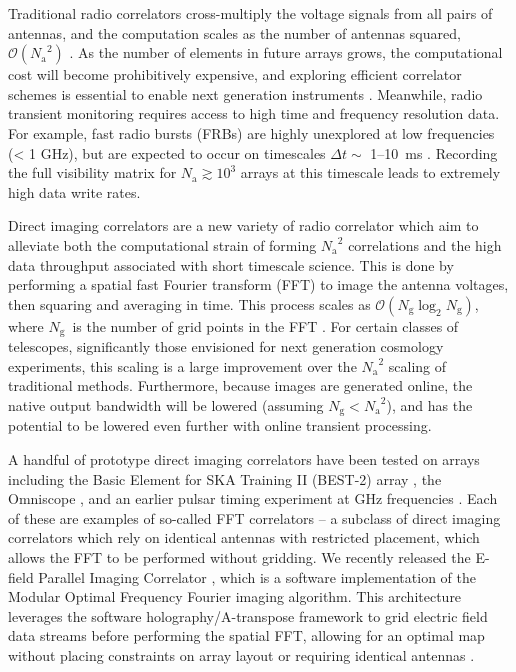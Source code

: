 \documentclass[a4paper,fleqn,usenatbib]{../mnras}
\newcommand{\Nant}{\ensuremath{N_{\mathrm{a}}}}
\newcommand{\Ng}{\ensuremath{N_{\mathrm{g}}}}
\begin{document}
Traditional radio correlators cross-multiply the voltage signals from all pairs of antennas, and the computation scales as the number of antennas squared, $\mathcal{O}(\Nant^2)$ \citep{bun04}. As the number of elements in future arrays grows, the computational cost will become prohibitively expensive, and exploring efficient correlator schemes is essential to enable next generation instruments \citep{lon00}. Meanwhile, radio transient monitoring requires access to high time and frequency resolution data. For example, fast radio bursts (FRBs) are highly unexplored at low frequencies (< 1 GHz), but are expected to occur on timescales $\Delta t \sim$ 1--10~ms \citep{tho13}. Recording the full visibility matrix for $\Nant \gtrsim 10^3$ arrays at this timescale leads to extremely high data write rates. 

Direct imaging correlators are a new variety of radio correlator which aim to alleviate both the computational strain of forming $\Nant^2$ correlations and the high data throughput associated with short timescale science. This is done by performing a spatial fast Fourier transform (FFT) to image the antenna voltages, then squaring and averaging in time. This process scales as $\mathcal{O}(\Ng \log_2 \Ng)$, where \Ng~is the number of grid points in the FFT \citep{mor11, teg09, teg10}. For certain classes of telescopes, significantly those envisioned for next generation cosmology experiments, this scaling is a large improvement over the $\Nant^2$ scaling of traditional methods. Furthermore, because images are generated online, the native output bandwidth will be lowered (assuming $\Ng < \Nant^2$), and has the potential to be lowered even further with online transient processing.

A handful of prototype direct imaging correlators have been tested on arrays including the Basic Element for SKA Training II (BEST-2) array \citep{fos14}, the Omniscope \citep{zhe14}, and an earlier pulsar timing experiment at GHz frequencies \citep{oto94, dai00}. Each of these are examples of so-called FFT correlators -- a subclass of direct imaging correlators which rely on identical antennas with restricted placement, which allows the FFT to be performed without gridding. We recently released the E-field Parallel Imaging Correlator \citep[EPIC;][]{thy15c}, which is a software implementation of the Modular Optimal Frequency Fourier \citep[MOFF;][]{mor11} imaging algorithm. This architecture leverages the software holography/A-transpose framework to grid electric field data streams before performing the spatial FFT, allowing for an optimal map without placing constraints on array layout or requiring identical antennas \citep{mor09,bha08,teg97a}.
\end{document}
